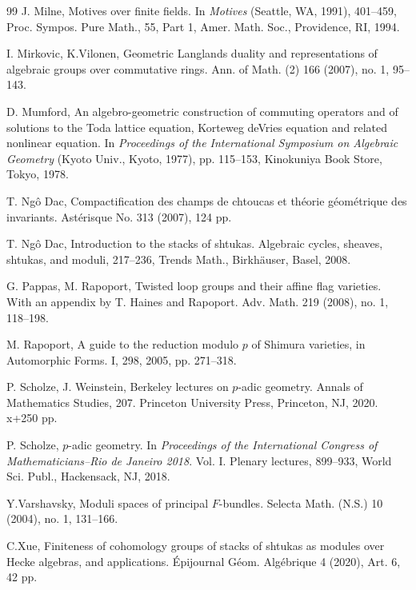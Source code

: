 \documentclass[11pt]{amsart}
\numberwithin{equation}{section}
\theoremstyle{plain}
\theoremstyle{definition}
\begin{document}
\begin{thebibliography}{99}
J. Milne, 
Motives over finite fields.
In {\em Motives} (Seattle, WA, 1991), 401--459, 
Proc. Sympos. Pure Math., 55, Part 1, Amer. Math. Soc., Providence, RI, 1994.

I. Mirkovic, K.Vilonen,
Geometric Langlands duality and representations of algebraic groups over commutative rings. 
Ann. of Math. (2) 166 (2007), no. 1, 95--143.


D. Mumford,
An algebro-geometric construction of commuting operators and of solutions to the Toda lattice equation, Korteweg deVries equation and related nonlinear equation. 
In {\em Proceedings of the International Symposium on Algebraic Geometry} (Kyoto Univ., Kyoto, 1977), pp. 115--153, Kinokuniya Book Store, Tokyo, 1978.



T. Ng\^o Dac,
Compactification des champs de chtoucas et th\'eorie g\'eom\'etrique des invariants.
Ast\'erisque No. 313 (2007), 124 pp.


T. Ng\^o Dac,
Introduction to the stacks of shtukas. 
Algebraic cycles, sheaves, shtukas, and moduli, 217--236, 
Trends Math., Birkh\"auser, Basel, 2008.
 
G. Pappas, M. Rapoport, 
Twisted loop groups and their affine flag varieties. With an appendix by T. Haines and Rapoport. Adv. Math. 219 (2008), no. 1, 118--198. 



M. Rapoport,
A guide to the reduction modulo $p$ of Shimura varieties, 
in Automorphic Forms. I, 298, 2005, pp. 271--318.


P. Scholze, J. Weinstein, 
Berkeley lectures on $p$-adic geometry. 
Annals of Mathematics Studies, 207. 
Princeton University Press, Princeton, NJ, 2020. x+250 pp.



P. Scholze, 
$p$-adic geometry. 
In {\em Proceedings of the International Congress of Mathematicians--Rio de Janeiro 2018}. Vol. I. Plenary lectures, 899--933, World Sci. Publ., Hackensack, NJ, 2018.

Y.Varshavsky, 
Moduli spaces of principal $F$-bundles. 
Selecta Math. (N.S.) 10 (2004), no. 1, 131--166. 

C.Xue,
Finiteness of cohomology groups of stacks of shtukas as modules over Hecke algebras, and applications.
\'Epijournal G\'eom. Alg\'ebrique 4 (2020), Art. 6, 42 pp.



\end{thebibliography}
\end{document}
